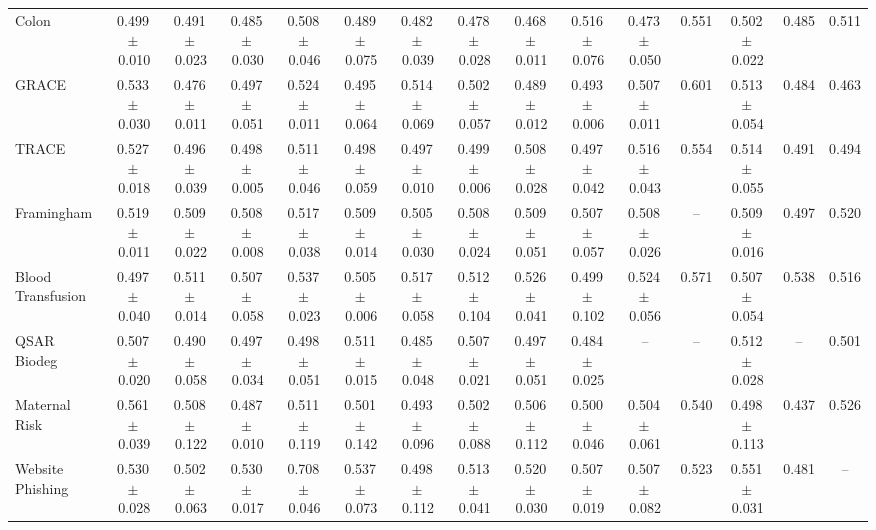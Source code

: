 \documentclass[8pt]{extarticle}
\begin{document}
\begin{longtable}{l*{14}{c}}
Colon & 0.499\,$\pm$\,0.010 & 0.491\,$\pm$\,0.023 & 0.485\,$\pm$\,0.030 & 0.508\,$\pm$\,0.046 & 0.489\,$\pm$\,0.075 & 0.482\,$\pm$\,0.039 & 0.478\,$\pm$\,0.028 & 0.468\,$\pm$\,0.011 & 0.516\,$\pm$\,0.076 & 0.473\,$\pm$\,0.050 & 0.551 & 0.502\,$\pm$\,0.022 & 0.485 & 0.511 \\
GRACE & 0.533\,$\pm$\,0.030 & 0.476\,$\pm$\,0.011 & 0.497\,$\pm$\,0.051 & 0.524\,$\pm$\,0.011 & 0.495\,$\pm$\,0.064 & 0.514\,$\pm$\,0.069 & 0.502\,$\pm$\,0.057 & 0.489\,$\pm$\,0.012 & 0.493\,$\pm$\,0.006 & 0.507\,$\pm$\,0.011 & 0.601 & 0.513\,$\pm$\,0.054 & 0.484 & 0.463 \\
TRACE & 0.527\,$\pm$\,0.018 & 0.496\,$\pm$\,0.039 & 0.498\,$\pm$\,0.005 & 0.511\,$\pm$\,0.046 & 0.498\,$\pm$\,0.059 & 0.497\,$\pm$\,0.010 & 0.499\,$\pm$\,0.006 & 0.508\,$\pm$\,0.028 & 0.497\,$\pm$\,0.042 & 0.516\,$\pm$\,0.043 & 0.554 & 0.514\,$\pm$\,0.055 & 0.491 & 0.494 \\
Framingham & 0.519\,$\pm$\,0.011 & 0.509\,$\pm$\,0.022 & 0.508\,$\pm$\,0.008 & 0.517\,$\pm$\,0.038 & 0.509\,$\pm$\,0.014 & 0.505\,$\pm$\,0.030 & 0.508\,$\pm$\,0.024 & 0.509\,$\pm$\,0.051 & 0.507\,$\pm$\,0.057 & 0.508\,$\pm$\,0.026 & -- & 0.509\,$\pm$\,0.016 & 0.497 & 0.520 \\
Blood Transfusion & 0.497\,$\pm$\,0.040 & 0.511\,$\pm$\,0.014 & 0.507\,$\pm$\,0.058 & 0.537\,$\pm$\,0.023 & 0.505\,$\pm$\,0.006 & 0.517\,$\pm$\,0.058 & 0.512\,$\pm$\,0.104 & 0.526\,$\pm$\,0.041 & 0.499\,$\pm$\,0.102 & 0.524\,$\pm$\,0.056 & 0.571 & 0.507\,$\pm$\,0.054 & 0.538 & 0.516 \\
QSAR Biodeg & 0.507\,$\pm$\,0.020 & 0.490\,$\pm$\,0.058 & 0.497\,$\pm$\,0.034 & 0.498\,$\pm$\,0.051 & 0.511\,$\pm$\,0.015 & 0.485\,$\pm$\,0.048 & 0.507\,$\pm$\,0.021 & 0.497\,$\pm$\,0.051 & 0.484\,$\pm$\,0.025 & -- & -- & 0.512\,$\pm$\,0.028 & -- & 0.501 \\
Maternal Risk & 0.561\,$\pm$\,0.039 & 0.508\,$\pm$\,0.122 & 0.487\,$\pm$\,0.010 & 0.511\,$\pm$\,0.119 & 0.501\,$\pm$\,0.142 & 0.493\,$\pm$\,0.096 & 0.502\,$\pm$\,0.088 & 0.506\,$\pm$\,0.112 & 0.500\,$\pm$\,0.046 & 0.504\,$\pm$\,0.061 & 0.540 & 0.498\,$\pm$\,0.113 & 0.437 & 0.526 \\
Website Phishing & 0.530\,$\pm$\,0.028 & 0.502\,$\pm$\,0.063 & 0.530\,$\pm$\,0.017 & 0.708\,$\pm$\,0.046 & 0.537\,$\pm$\,0.073 & 0.498\,$\pm$\,0.112 & 0.513\,$\pm$\,0.041 & 0.520\,$\pm$\,0.030 & 0.507\,$\pm$\,0.019 & 0.507\,$\pm$\,0.082 & 0.523 & 0.551\,$\pm$\,0.031 & 0.481 & -- \\
\end{longtable}
\end{document}
